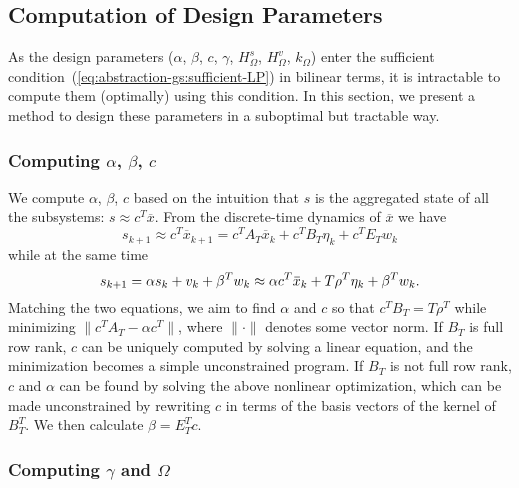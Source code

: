 \subsection{Computation of Design Parameters}
\label{sec:abstraction-gs:computation}

As the design parameters ($\alpha$, $\beta$, $c$, $\gamma$, $H_{\Omega}^{s}$, $H_{\Omega}^{v}$, $k_{\Omega}$) enter the sufficient condition~(\cref{eq:abstraction-gs:sufficient-LP}) in bilinear terms, %
it is intractable to compute them (optimally) using this condition.
In this section, we present a method to design these parameters in a suboptimal but tractable way.

\subsubsection{Computing $\alpha$, $\beta$, $c$}
\label{sec:abstraction-gs:params:model}

We compute $\alpha$, $\beta$, $c$ based on the intuition that $s$ is the aggregated state of all the subsystems: $s \approx c^{T} \overbar{x}$.
From the discrete-time dynamics of $\overbar{x}$ we have
\begin{equation*}
  s_{k+1} \approx c^{T} \overbar{x}_{k+1} = c^{T} A_{T} \overbar{x}_{k} + c^{T} B_{T} \eta_{k} + c^{T} E_{T} w_{k}
\end{equation*}
while at the same time 
\begin{equation*}
s_{k+1} = \alpha s_{k} + v_{k} + \beta^{T} w_{k} \approx \alpha c^{T} \overbar{x}_{k} + T \rho^{T} \eta_{k} + \beta^{T} w_{k} \text.
\end{equation*}
Matching the two equations, we aim to find $\alpha$ and $c$ so that
$c^{T} B_{T} = T \rho^{T}$
while minimizing $\| c^{T} A_{T} - \alpha c^{T} \|$, where $\|\cdot\|$ denotes some vector norm.
If $B_{T}$ is full row rank, $c$ can be uniquely computed by solving a linear equation, and the minimization becomes a simple unconstrained program.
If $B_{T}$ is not full row rank, $c$ and $\alpha$ can be found by solving the above nonlinear optimization, which can be made unconstrained by rewriting $c$ in terms of the basis vectors of the kernel of $B_{T}^{T}$.
We then calculate $\beta = E_{T}^{T} c$.


\subsubsection{Computing $\gamma$ and $\Omega$}
\label{sec:abstraction-gs:params:omega}

